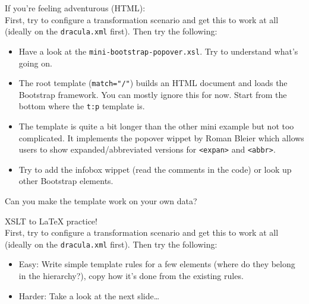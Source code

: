 \begin{frame}[standout]
    \alert{If you're feeling adventurous (HTML):} \\
    \small
    First, try to configure a transformation scenario and get this to work at all (ideally on the \texttt{dracula.xml} first). Then try the following:
    \begin{itemize}\small
        \item Have a look at the \texttt{mini-bootstrap-popover.xsl}. Try to understand what's going on. 
        \item The root template (\texttt{match="/"}) builds an HTML document and loads the Bootstrap framework. You can mostly ignore this for now. Start from the bottom where the \texttt{t:p} template is. 
        \item The template is quite a bit longer than the other mini example but not too complicated. It implements the popover wippet by Roman Bleier which allows users to show expanded/abbreviated versions for \texttt{<expan>} and \texttt{<abbr>}.  
        \item Try to add the infobox wippet (read the comments in the code) or look up other Bootstrap elements.
    \end{itemize} 
    Can you make the template work on your own data?
\end{frame}


\begin{frame}[standout]
    \alert{XSLT to \LaTeX{} practice!} \\
    \small
    First, try to configure a transformation scenario and get this to work at all (ideally on the \texttt{dracula.xml} first). Then try the following:
    \begin{itemize}\small
        \item \alert{Easy:} Write simple template rules for a few elements (where do they belong in the hierarchy?), copy how it's done from the existing rules.
        \item \alert{Harder:} Take a look at the next slide\dots
    \end{itemize} 
\end{frame}

